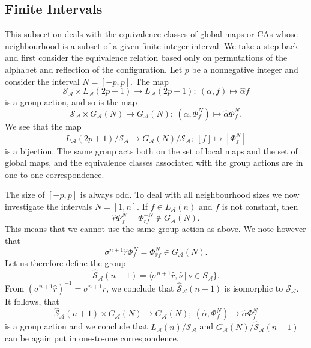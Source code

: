 \documentclass[a4paper]{article}
\begin{document}
\subsection{Finite Intervals}

This subsection deals with the equivalence classes of global maps or CAs whose neighbourhood
is a subset of a given finite integer interval.
We take a step back and first consider the equivalence relation based only on
permutations of the alphabet and reflection of the configuration.
Let $p$ be a nonnegative integer and consider the interval $N=[-p,p]$.
The map
\[
\mathcal{S}_\mathcal{A}  \times L_\mathcal{A}(2p+1) \to L_\mathcal{A}(2p+1); \
(\alpha, f) \mapsto \hat{\alpha}f
\]
is a group action, and so
is the map
\[
\mathcal{S}_\mathcal{A} \times G_\mathcal{A}(N) \to G_\mathcal{A}(N); \
(\alpha, \Phi^N_f) \mapsto \hat{\alpha} \Phi^N_f.
\]
We see that the map
\[
L_\mathcal{A}(2p+1) / \mathcal{S}_\mathcal{A} \to G_\mathcal{A}(N)/\mathcal{S}_\mathcal{A}; \
[f] \mapsto [\Phi^N_f]
\]
 is a bijection.
The same group acts both on the set of local maps and the set of global maps,
and the equivalence classes associated with the group actions are in one-to-one correspondence.

The size of $[-p,p]$ is always odd.
To deal with all neighbourhood sizes we now investigate the intervals $N = [1,n]$.
If $f \in L_\mathcal{A}(n)$ and $f$ is not constant, then
\[
\hat{r}\Phi^{N}_f = \Phi^{-N}_{\hat{r}f} \not \in G_\mathcal{A}(N).
\]
This means that we cannot use the same group action as above.
We note however that
\[
\sigma^{n+1}\hat{r}\Phi^N_f = \Phi^{N}_{\hat{r}f} \in G_\mathcal{A}(N).
\]
Let us therefore define the group
\[
\hat{\mathcal{S}}_\mathcal{A}(n+1) = \langle \sigma^{n+1}\hat{r}, \hat{\nu} \, | \, \nu \in S_\mathcal{A} \}.
\]
From $(\sigma^{n+1}\hat{r})^{-1} = \sigma^{n+1}\hat{r}$, we conclude that
$\hat{\mathcal{S}}_\mathcal{A}(n+1)$ is isomorphic to $\mathcal{S}_\mathcal{A}$.
It follows, that
\[
\hat{\mathcal{S}}_\mathcal{A}(n+1) \times G_\mathcal{A}(N) \to G_\mathcal{A}(N); \
(\hat{\alpha}, \Phi^N_f) \mapsto \hat{\alpha} \Phi^N_f
\]
is a group action and we conclude that
$L_\mathcal{A}(n) / \mathcal{S}_\mathcal{A}$
and $G_\mathcal{A}(N)/\hat{\mathcal{S}}_\mathcal{A}(n+1)$ can be again put in one-to-one correspondence.
\end{document}
